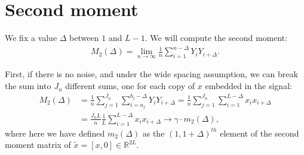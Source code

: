 \documentclass{article}
\theoremstyle{thm}
\theoremstyle{definition}
\begin{document}
\begin{comment}

Actually, what Tamir meant when he said first moment was the average of the windows' averages (a scalar), not the average window (a vector). But this also converges a.s.\ to $\gamma \cdot \bar{x}$, by simply exchanging limits and finite sums, as follows. The sample mean of the window starting at index $i$ is just $\frac{1}{L} \sum_{k=0}^{L-1} Y_{i+k}$. Averaging these over all $n$ windows and taking the limit as $n \to \infty$ we get:
%
\begin{align}
%
    \lim_{n\to\infty} \frac{1}{n} \sum_{i=1}^n \frac{1}{L} \sum_{k=0}^{L-1} Y_{i+k}
    =  \frac{1}{L} \sum_{k=0}^{L-1} \lim_{n\to\infty} \frac{1}{n} \sum_{i=1}^n Y_{i+k}
    = \gamma \cdot \bar{x}.
%
\end{align}

\end{comment}

%
%
%

\section{Second moment}

We fix a value $\Delta$ between $1$ and $L-1$. We will compute the second moment:
%
\begin{align}
%
    M_2(\Delta) = 
        \lim_{n \to \infty} \frac{1}{n} \sum_{i=1}^{n-\Delta} Y_i Y_{i+\Delta}.
%
\end{align}

First, if there is no noise, and under the wide spacing assumption, we can break the sum into $J_n$ different sums, one for each copy of $x$ embedded in the signal:
%
\begin{align}
%
    M_2(\Delta) 
        &= \frac{1}{n} \sum_{j=1}^{J_n} \sum_{i=a_j}^{b_j-\Delta} Y_i Y_{i+\Delta}
        = \frac{1}{n} \sum_{j=1}^{J_n} \sum_{i=1}^{L-\Delta} x_i x_{i+\Delta}
    \nonumber \\
    &= \frac{J_n L}{n} \frac{1}{L} \sum_{i=1}^{L-\Delta} x_i x_{i+\Delta}
    \to \gamma \cdot m_2(\Delta),
%
\end{align}
%
where here we have defined $m_2(\Delta)$ as the $(1,1+\Delta)^{th}$ element of the second moment matrix of $\tilde{x} = [x,0] \in \mathbb{R}^{2L}$.
\end{document}
